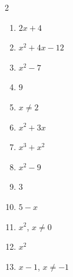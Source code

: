 \documentclass[11pt]{article}
\begin{document}
\begin{keybox}
\begin{multicols}{2}
\small
\begin{enumerate}[leftmargin=*,itemsep=3pt]
  \item $2x+4$
  \item $x^2+4x-12$
  \item $x^2-7$
  \item $9$
  \item $x\ne2$
  \item $x^2+3x$
  \item $x^3+x^2$
  \item $x^2-9$
  \item $3$
  \item $5-x$
  \item $x^2$, $x\ne0$
  \item $x^2$
  \item $x-1$, $x\ne-1$
\end{enumerate}
\end{multicols}
\end{keybox}
\end{document}
